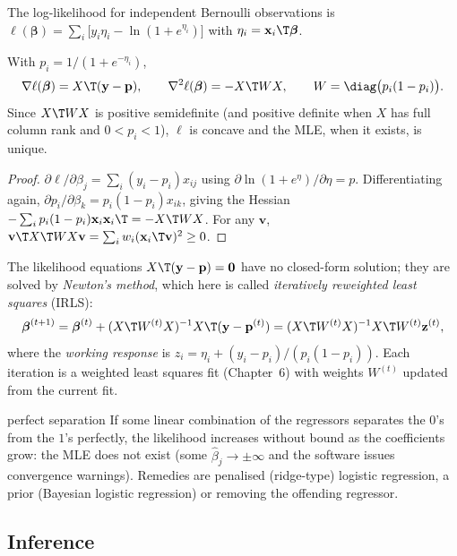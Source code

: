 The log-likelihood for independent Bernoulli observations is $\ell(\boldsymbol\beta)=\sum_i\big[y_i\eta_i-\ln(1+e^{\eta_i})\big]$ with $\eta_i=\mathbf{x}_i\T\boldsymbol\beta$.

\begin{theorem}\label{thm:logit-score}
With $p_i=1/(1+e^{-\eta_i})$,
\[ \nabla\ell(\boldsymbol\beta)=X\T(\mathbf{y}-\mathbf{p}),\qquad\nabla^2\ell(\boldsymbol\beta)=-X\T WX,\qquad W=\diag\big(p_i(1-p_i)\big). \]
Since $X\T WX$ is positive semidefinite (and positive definite when $X$ has full column rank and $0<p_i<1$), $\ell$ is concave and the MLE, when it exists, is unique.
\end{theorem}

\begin{proof}
$\partial\ell/\partial\beta_j=\sum_i(y_i-p_i)x_{ij}$ using $\partial\ln(1+e^{\eta})/\partial\eta=p$. Differentiating again, $\partial p_i/\partial\beta_k=p_i(1-p_i)x_{ik}$, giving the Hessian $-\sum_ip_i(1-p_i)\mathbf{x}_i\mathbf{x}_i\T=-X\T WX$. For any $\mathbf{v}$, $\mathbf{v}\T X\T WX\mathbf{v}=\sum_iw_i(\mathbf{x}_i\T\mathbf{v})^2\ge0$.
\end{proof}

The likelihood equations $X\T(\mathbf{y}-\mathbf{p})=\mathbf{0}$ have no closed-form solution; they are solved by \emph{Newton's method}, which here is called \emph{iteratively reweighted least squares} (IRLS):
\[ \boldsymbol\beta^{(t+1)}=\boldsymbol\beta^{(t)}+(X\T W^{(t)}X)^{-1}X\T(\mathbf{y}-\mathbf{p}^{(t)})=(X\T W^{(t)}X)^{-1}X\T W^{(t)}\mathbf{z}^{(t)}, \]
where the \emph{working response} is $z_i=\eta_i+(y_i-p_i)/(p_i(1-p_i))$. Each iteration is a weighted least squares fit (Chapter~6) with weights $W^{(t)}$ updated from the current fit.

\begin{pitfall}{perfect separation}
If some linear combination of the regressors separates the $0$'s from the $1$'s perfectly, the likelihood increases without bound as the coefficients grow: the MLE does not exist (some $\hat\beta_j\to\pm\infty$ and the software issues convergence warnings). Remedies are penalised (ridge-type) logistic regression, a prior (Bayesian logistic regression) or removing the offending regressor.
\end{pitfall}

\subsection{Inference}

